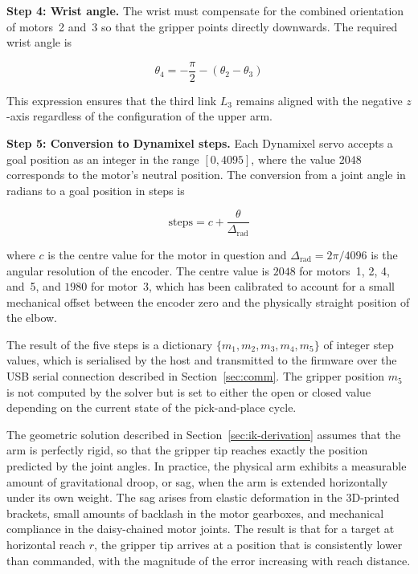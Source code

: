 \textbf{Step 4: Wrist angle.} The wrist must compensate for the 
combined orientation of motors~2 and~3 so that the gripper points 
directly downwards. The required wrist angle is

\begin{equation}
    \theta_4 = -\frac{\pi}{2} - (\theta_2 - \theta_3)
\end{equation}

This expression ensures that the third link $L_3$ remains aligned 
with the negative $z$-axis regardless of the configuration of the 
upper arm.

\textbf{Step 5: Conversion to Dynamixel steps.} Each Dynamixel 
servo accepts a goal position as an integer in the range 
$[0, 4095]$, where the value $2048$ corresponds to the motor's 
neutral position. The conversion from a joint angle in radians 
to a goal position in steps is

\begin{equation}
    \mathrm{steps} = c + \frac{\theta}{\Delta_{\mathrm{rad}}}
    \label{eq:dynamixel_steps}
\end{equation}

where $c$ is the centre value for the motor in question and 
$\Delta_{\mathrm{rad}} = 2\pi / 4096$ is the angular resolution 
of the encoder. The centre value is $2048$ for motors~1, 2, 4, 
and~5, and $1980$ for motor~3, which has been calibrated to 
account for a small mechanical offset between the encoder zero 
and the physically straight position of the elbow.

The result of the five steps is a dictionary 
$\{m_1, m_2, m_3, m_4, m_5\}$ of integer step values, which is 
serialised by the host and transmitted to the firmware over the 
USB serial connection described in Section~\ref{sec:comm}. The gripper 
position $m_5$ is not computed by the solver but is set to 
either the open or closed value depending on the current state 
of the pick-and-place cycle.


\label{sec:sag}

The geometric solution described in Section~\ref{sec:ik-derivation} assumes that the 
arm is perfectly rigid, so that the gripper tip reaches exactly 
the position predicted by the joint angles. In practice, the 
physical arm exhibits a measurable amount of gravitational droop, 
or sag, when the arm is extended horizontally under its own 
weight. The sag arises from elastic deformation in the 
3D-printed brackets, small amounts of backlash in the motor 
gearboxes, and mechanical compliance in the daisy-chained motor 
joints. The result is that for a target at horizontal reach $r$, 
the gripper tip arrives at a position that is consistently lower 
than commanded, with the magnitude of the error increasing with 
reach distance.

